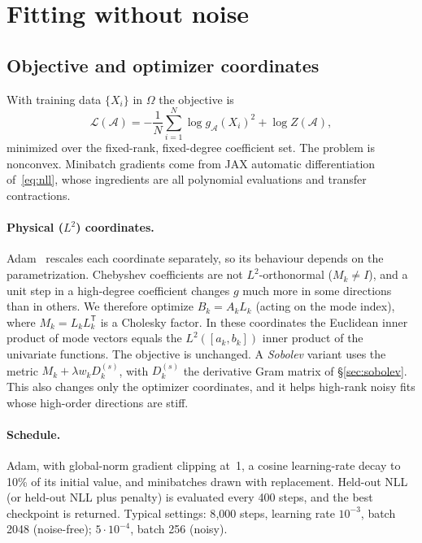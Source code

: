 \documentclass[11pt]{article}
\theoremstyle{definition}
\theoremstyle{remark}
\newcommand{\T}{\mathsf{T}}
\begin{document}
\section{Fitting without noise}
\label{sec:fit}

\subsection{Objective and optimizer coordinates}
With training data $\{X_i\}$ in $\Omega$ the objective is
\begin{equation}\label{eq:nll}
  \mathcal L(\mathcal A)=-\frac1N\sum_{i=1}^N\log g_{\mathcal A}(X_i)^2+\log Z(\mathcal A),
\end{equation}
minimized over the fixed-rank, fixed-degree coefficient set. The problem is nonconvex. Minibatch gradients come
from JAX automatic differentiation of~\eqref{eq:nll}, whose ingredients are all polynomial evaluations and
transfer contractions.

\paragraph{Physical ($L^2$) coordinates.}
Adam~\cite{kingma2015adam} rescales each coordinate separately, so its behaviour depends on the parametrization.
Chebyshev coefficients are not $L^2$-orthonormal ($M_k\neq I$), and a unit step in a high-degree coefficient
changes $g$ much more in some directions than in others. We therefore optimize $B_k=A_kL_k$ (acting on the mode index),
where $M_k=L_kL_k^\T$ is a Cholesky factor. In these coordinates the Euclidean inner product of mode vectors equals
the $L^2([a_k,b_k])$ inner product of the univariate functions. The objective is unchanged. A \emph{Sobolev}
variant uses the metric $M_k+\lambda w_kD_k^{(s)}$, with $D_k^{(s)}$ the derivative Gram matrix of
\S\ref{sec:sobolev}. This also changes only the optimizer coordinates, and it helps high-rank noisy fits whose
high-order directions are stiff.

\paragraph{Schedule.}
Adam, with global-norm gradient clipping at~1, a cosine learning-rate decay to 10\% of its initial value, and
minibatches drawn with replacement. Held-out NLL (or held-out NLL plus penalty) is evaluated every 400 steps, and
the best checkpoint is returned. Typical settings: 8{,}000 steps, learning rate $10^{-3}$, batch 2048 (noise-free);
$5\cdot 10^{-4}$, batch 256 (noisy).
\end{document}
